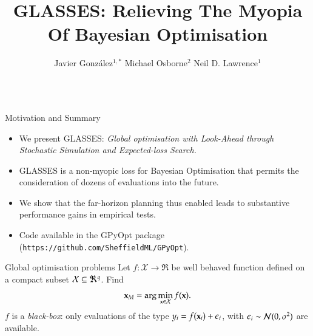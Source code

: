 \documentclass[15pt,serif,mathserif,final]{beamer}
\title{\Huge{GLASSES: Relieving The Myopia Of Bayesian Optimisation}}
\author{Javier Gonz\'{a}lez$^{1,*}$ \quad Michael Osborne$^{2}$ \quad  Neil D. Lawrence$^{1}$}
\institute{$^1$University of Sheffield, $^2$University of Oxford}
\begin{document}
\begin{frame}{}
  \begin{columns}[t]

    \begin{column}{0.32\linewidth}

      \begin{block}{Motivation and Summary}





\begin{itemize}
\item We present \textcolor{mycolor}{GLASSES}: \emph{Global optimisation with Look-Ahead through Stochastic Simulation and Expected-loss Search.} 
\item GLASSES is a \textcolor{mycolor}{non-myopic loss for Bayesian Optimisation} that permits the consideration of dozens of evaluations into the future.
\item We show that \textcolor{mycolor}{the far-horizon planning thus enabled leads to substantive performance gains} in empirical tests. 
\item Code available in the \textcolor{mycolor}{GPyOpt} package (\texttt{https://github.com/SheffieldML/GPyOpt}).
\end{itemize}
      \end{block}

      
\begin{block}{Global optimisation problems}
Let $f: {\mathcal X} \to \Re$ be well behaved function defined on a compact subset ${\mathcal X} \subseteq \Re^{q}$. Find 
$$\mathbf{x}_{M} = \arg \min_{\mathbf{x} \in {\mathcal X}} f(\mathbf{x}).$$ 
\textcolor{mycolor}{$f$ is a \emph{black-box}}: only evaluations of the type $y_i = f(\mathbf{x}_i) + \epsilon_i$, with $\epsilon_i \sim\mathcal{N}(0,\sigma^2)$ are  available.
\end{block}      
      
\end{column}
\end{columns}
\end{frame}
\end{document}
